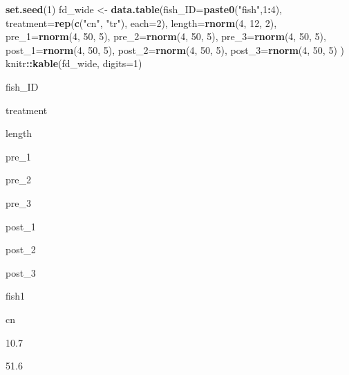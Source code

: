 \documentclass[]{book}
\newenvironment{Shaded}{\begin{snugshade}}{\end{snugshade}}
\newcommand{\DataTypeTok}[1]{\textcolor[rgb]{0.13,0.29,0.53}{#1}}
\newcommand{\DecValTok}[1]{\textcolor[rgb]{0.00,0.00,0.81}{#1}}
\newcommand{\KeywordTok}[1]{\textcolor[rgb]{0.13,0.29,0.53}{\textbf{#1}}}
\newcommand{\NormalTok}[1]{#1}
\newcommand{\OperatorTok}[1]{\textcolor[rgb]{0.81,0.36,0.00}{\textbf{#1}}}
\newcommand{\StringTok}[1]{\textcolor[rgb]{0.31,0.60,0.02}{#1}}
\begin{document}
\begin{Shaded}
\begin{Highlighting}[]
\KeywordTok{set.seed}\NormalTok{(}\DecValTok{1}\NormalTok{)}
\NormalTok{fd_wide <-}\StringTok{ }\KeywordTok{data.table}\NormalTok{(}\DataTypeTok{fish_ID=}\KeywordTok{paste0}\NormalTok{(}\StringTok{"fish"}\NormalTok{,}\DecValTok{1}\OperatorTok{:}\DecValTok{4}\NormalTok{),}
                      \DataTypeTok{treatment=}\KeywordTok{rep}\NormalTok{(}\KeywordTok{c}\NormalTok{(}\StringTok{"cn"}\NormalTok{, }\StringTok{"tr"}\NormalTok{), }\DataTypeTok{each=}\DecValTok{2}\NormalTok{),}
                      \DataTypeTok{length=}\KeywordTok{rnorm}\NormalTok{(}\DecValTok{4}\NormalTok{, }\DecValTok{12}\NormalTok{, }\DecValTok{2}\NormalTok{),}
                      \DataTypeTok{pre_1=}\KeywordTok{rnorm}\NormalTok{(}\DecValTok{4}\NormalTok{, }\DecValTok{50}\NormalTok{, }\DecValTok{5}\NormalTok{),}
                      \DataTypeTok{pre_2=}\KeywordTok{rnorm}\NormalTok{(}\DecValTok{4}\NormalTok{, }\DecValTok{50}\NormalTok{, }\DecValTok{5}\NormalTok{),}
                      \DataTypeTok{pre_3=}\KeywordTok{rnorm}\NormalTok{(}\DecValTok{4}\NormalTok{, }\DecValTok{50}\NormalTok{, }\DecValTok{5}\NormalTok{),}
                      \DataTypeTok{post_1=}\KeywordTok{rnorm}\NormalTok{(}\DecValTok{4}\NormalTok{, }\DecValTok{50}\NormalTok{, }\DecValTok{5}\NormalTok{),}
                      \DataTypeTok{post_2=}\KeywordTok{rnorm}\NormalTok{(}\DecValTok{4}\NormalTok{, }\DecValTok{50}\NormalTok{, }\DecValTok{5}\NormalTok{),}
                      \DataTypeTok{post_3=}\KeywordTok{rnorm}\NormalTok{(}\DecValTok{4}\NormalTok{, }\DecValTok{50}\NormalTok{, }\DecValTok{5}\NormalTok{)}
\NormalTok{                      )}
\NormalTok{knitr}\OperatorTok{::}\KeywordTok{kable}\NormalTok{(fd_wide, }\DataTypeTok{digits=}\DecValTok{1}\NormalTok{)}
\end{Highlighting}
\end{Shaded}

fish\_ID

treatment

length

pre\_1

pre\_2

pre\_3

post\_1

post\_2

post\_3

fish1

cn

10.7

51.6
\end{document}

